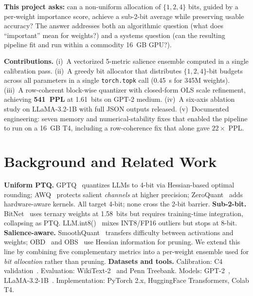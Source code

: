 \documentclass[11pt]{article}
\begin{document}
\textbf{This project asks:} can a non-uniform allocation of $\{1,2,4\}$ bits, guided by a
per-weight importance score, achieve a sub-2-bit average while preserving usable accuracy?
The answer addresses both an algorithmic question (what does ``important'' mean for weights?)
and a systems question (can the resulting pipeline fit and run within a commodity 16~GB GPU?).

\textbf{Contributions.}
(i)~A vectorized 5-metric salience ensemble computed in a single calibration pass.
(ii)~A greedy bit allocator that distributes $\{1,2,4\}$-bit budgets across all parameters
in a single \texttt{torch.topk} call (0.45~s for 345M weights).
(iii)~A row-coherent block-wise quantizer with closed-form OLS scale refinement, achieving
\textbf{541~PPL} at 1.61~bits on GPT-2 medium.
(iv)~A six-axis ablation study on LLaMA-3.2-1B with full JSON outputs released.
(v)~Documented engineering: seven memory and numerical-stability fixes that enabled the
pipeline to run on a 16~GB T4, including a row-coherence fix that alone gave $22\times$ PPL.

\section{Background and Related Work}
\label{sec:related}

\textbf{Uniform PTQ.} GPTQ~\cite{frantar2023gptq} quantizes LLMs to 4-bit via Hessian-based
optimal rounding; AWQ~\cite{lin2024awq} protects salient \emph{channels} at higher precision;
ZeroQuant~\cite{yao2022zeroquant} adds hardware-aware kernels.
All target 4-bit; none cross the 2-bit barrier.
\textbf{Sub-2-bit.} BitNet~\cite{wang2023bitnet} uses ternary weights at 1.58~bits but
requires training-time integration, collapsing as PTQ.
LLM.int8()~\cite{dettmers2022llm} mixes INT8/FP16 outliers but stops at 8-bit.
\textbf{Salience-aware.} SmoothQuant~\cite{xiao2023smoothquant} transfers difficulty
between activations and weights;
OBD~\cite{lecun1990obd} and OBS~\cite{hassibi1993obs} use Hessian information for pruning.
We extend this line by combining five complementary metrics into a per-weight ensemble used
for \emph{bit allocation} rather than pruning.
\textbf{Datasets and tools.} Calibration: C4 validation~\cite{raffel2020t5}.
Evaluation: WikiText-2~\cite{merity2017wikitext} and Penn Treebank.
Models: GPT-2~\cite{radford2019gpt2}, LLaMA-3.2-1B~\cite{touvron2023llama}.
Implementation: PyTorch 2.x, HuggingFace Transformers, Colab T4.
\end{document}
